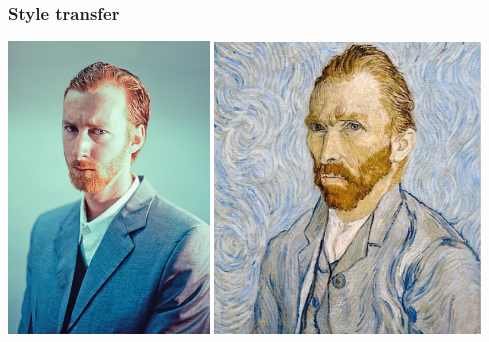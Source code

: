\documentclass[default]{beamer}
\begin{document}
	\begin{frame}
		\frametitle{Style transfer}
		
		\centering
		\includegraphics[width=0.4\textwidth]{da_intro4.jpg}\hspace*{10pt}
		\includegraphics[width=0.53\textwidth]{da_intro5.jpg}
	\end{frame}
\end{document}
